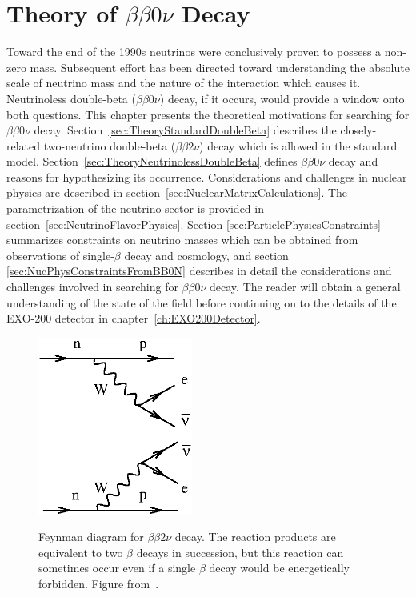 \renewcommand{\thechapter}{2}
\chapter{Theory of \texorpdfstring{$\beta\beta 0\nu$}{Neutrinoless Double-Beta} Decay}
\label{ch:BB0NTheory}

Toward the end of the 1990s neutrinos were conclusively proven to possess a non-zero mass.  Subsequent effort has been directed toward understanding the absolute scale of neutrino mass and the nature of the interaction which causes it.  Neutrinoless double-beta ($\beta\beta 0\nu$) decay, if it occurs, would provide a window onto both questions.  This chapter presents the theoretical motivations for searching for $\beta\beta 0\nu$ decay.  Section~\ref{sec:TheoryStandardDoubleBeta} describes the closely-related two-neutrino double-beta ($\beta\beta 2\nu$) decay which is allowed in the standard model.  Section~\ref{sec:TheoryNeutrinolessDoubleBeta} defines $\beta\beta 0\nu$ decay and reasons for hypothesizing its occurrence.  Considerations and challenges in nuclear physics are described in section~\ref{sec:NuclearMatrixCalculations}.  The parametrization of the neutrino sector is provided in section~\ref{sec:NeutrinoFlavorPhysics}.  Section \ref{sec:ParticlePhysicsConstraints} summarizes constraints on neutrino masses which can be obtained from observations of single-$\beta$ decay and cosmology, and section \ref{sec:NucPhysConstraintsFromBB0N} describes in detail the considerations and challenges involved in searching for $\beta\beta 0\nu$ decay.  The reader will obtain a general understanding of the state of the field before continuing on to the details of the EXO-200 detector in chapter~\ref{ch:EXO200Detector}.

\begin{figure}
\begin{center}
\includegraphics[keepaspectratio=true,width=2in]{Avignone_fig02a.eps}
\end{center}
\renewcommand{\baselinestretch}{1}
\small\normalsize
\begin{quote}
\caption{Feynman diagram for $\beta\beta 2 \nu$ decay.  The reaction products are equivalent to two $\beta$ decays in succession, but this reaction can sometimes occur even if a single $\beta$ decay would be energetically forbidden.  Figure from~\cite{RMPbb0n}.}
\label{fig:FeynmanBetaBeta2Nu}
\end{quote}
\end{figure}
\renewcommand{\baselinestretch}{2}
\small\normalsize

